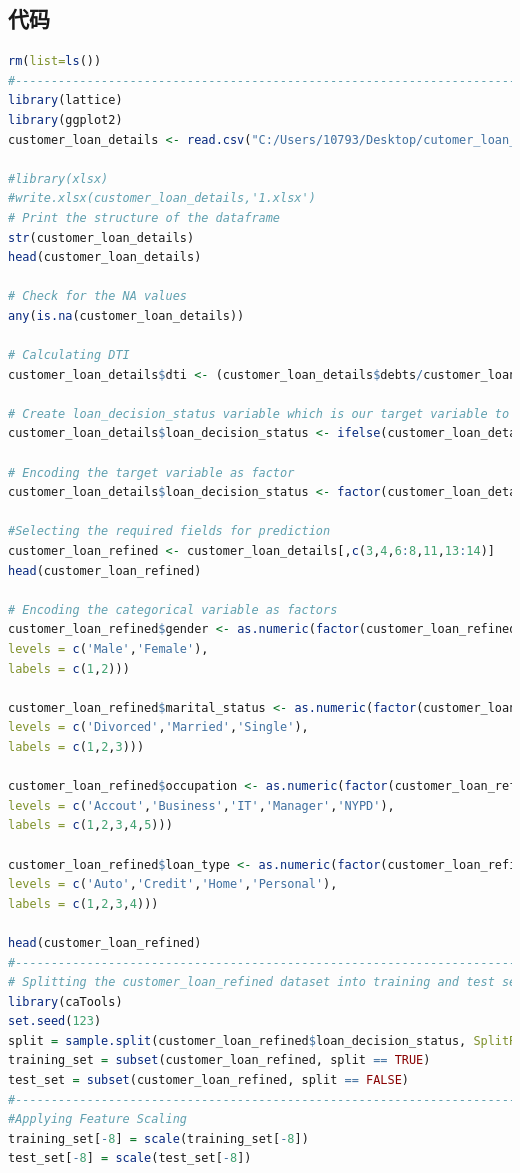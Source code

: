 \documentclass[UTF8]{ctexart}
\begin{document}
\newpage
\begin{appendices}
\section{代码}
\begin{lstlisting}[language=R]
rm(list=ls())
#--------------------------------------------------------------------------
library(lattice)
library(ggplot2)
customer_loan_details <- read.csv("C:/Users/10793/Desktop/cutomer_loan_details.csv", sep = ",")

#library(xlsx)
#write.xlsx(customer_loan_details,'1.xlsx')
# Print the structure of the dataframe
str(customer_loan_details)
head(customer_loan_details)

# Check for the NA values
any(is.na(customer_loan_details))

# Calculating DTI
customer_loan_details$dti <- (customer_loan_details$debts/customer_loan_details$income)*100

# Create loan_decision_status variable which is our target variable to use for loan prediction
customer_loan_details$loan_decision_status <- ifelse(customer_loan_details$loan_decision_type == 'Denied', 0, 1)

# Encoding the target variable as factor
customer_loan_details$loan_decision_status <- factor(customer_loan_details$loan_decision_status, levels = c(0, 1))

#Selecting the required fields for prediction
customer_loan_refined <- customer_loan_details[,c(3,4,6:8,11,13:14)]
head(customer_loan_refined)

# Encoding the categorical variable as factors
customer_loan_refined$gender <- as.numeric(factor(customer_loan_refined$gender,
levels = c('Male','Female'),
labels = c(1,2)))

customer_loan_refined$marital_status <- as.numeric(factor(customer_loan_refined$marital_status,
levels = c('Divorced','Married','Single'),
labels = c(1,2,3)))

customer_loan_refined$occupation <- as.numeric(factor(customer_loan_refined$occupation,
levels = c('Accout','Business','IT','Manager','NYPD'),
labels = c(1,2,3,4,5)))

customer_loan_refined$loan_type <- as.numeric(factor(customer_loan_refined$loan_type,
levels = c('Auto','Credit','Home','Personal'),
labels = c(1,2,3,4)))

head(customer_loan_refined)
#--------------------------------------------------------------------------
# Splitting the customer_loan_refined dataset into training and test sets
library(caTools)
set.seed(123)
split = sample.split(customer_loan_refined$loan_decision_status, SplitRatio = 0.70)
training_set = subset(customer_loan_refined, split == TRUE)
test_set = subset(customer_loan_refined, split == FALSE)
#--------------------------------------------------------------------------
#Applying Feature Scaling
training_set[-8] = scale(training_set[-8])
test_set[-8] = scale(test_set[-8])


\end{lstlisting}
\end{appendices}
\end{document}
